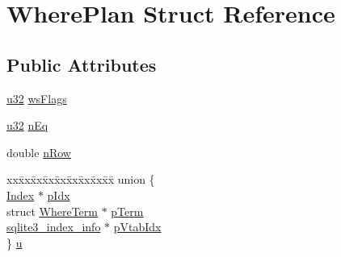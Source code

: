 \hypertarget{struct_where_plan}{\section{Where\-Plan Struct Reference}
\label{struct_where_plan}
}
\subsection*{Public Attributes}
\begin{DoxyCompactItemize}
\item 
\hyperlink{sqlite3_8c_a03ad5adfaeb9b7640dde78a0cc390319}{u32} \hyperlink{struct_where_plan_a6b81c2c91b28ac8898f382db2da6707b}{ws\-Flags}
\item 
\hyperlink{sqlite3_8c_a03ad5adfaeb9b7640dde78a0cc390319}{u32} \hyperlink{struct_where_plan_a40932e9221e83032c43f147d287e3847}{n\-Eq}
\item 
double \hyperlink{struct_where_plan_af32764f764b0d160c63eb730d9064f64}{n\-Row}
\item 
\begin{tabbing}
xx\=xx\=xx\=xx\=xx\=xx\=xx\=xx\=xx\=\kill
union \{\\
\>\hyperlink{struct_index}{Index} $\ast$ \hyperlink{struct_where_plan_a074ae9f009e0b2bf0a2121a30f959855}{pIdx}\\
\>struct \hyperlink{struct_where_term}{WhereTerm} $\ast$ \hyperlink{struct_where_plan_a85501aa7df9d6e7bc4e867c71a7a8b7a}{pTerm}\\
\>\hyperlink{structsqlite3__index__info}{sqlite3\_index\_info} $\ast$ \hyperlink{struct_where_plan_ac49d2637a631885c4c277d0ea35b14f8}{pVtabIdx}\\
\} \hyperlink{struct_where_plan_a00bc8b9f4e902606b3ca733878ff7131}{u}\\

\end{tabbing}\end{DoxyCompactItemize}


